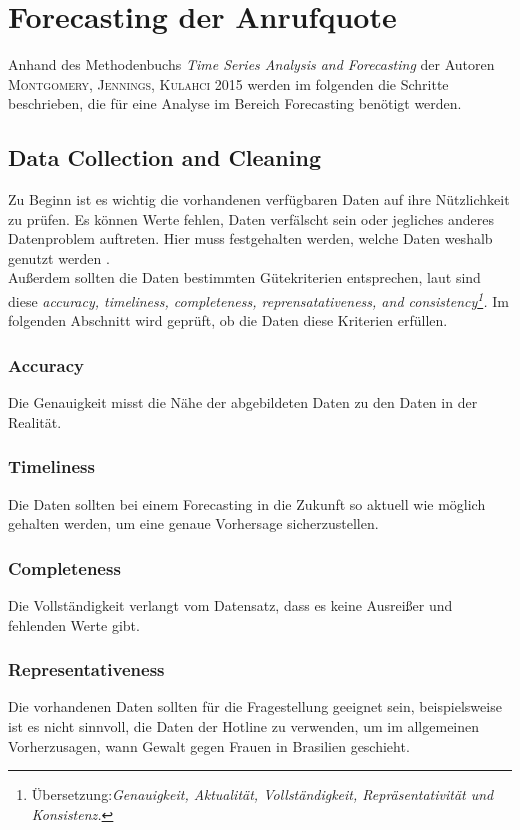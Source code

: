 \documentclass[12pt]{report}
\begin{document}
	\section{Forecasting der Anrufquote}
	Anhand des Methodenbuchs \textit{Time Series Analysis and Forecasting} der Autoren \textsc{Montgomery, Jennings, Kulahci} 2015 \cite{Montgomery.2015} werden im folgenden die Schritte beschrieben, die für eine Analyse im Bereich Forecasting benötigt werden.\\
	\subsection{Data Collection and Cleaning}
	Zu Beginn ist es wichtig die vorhandenen verfügbaren Daten auf ihre Nützlichkeit zu prüfen. Es können Werte fehlen, Daten verfälscht sein oder jegliches anderes Datenproblem auftreten. Hier muss festgehalten werden, welche Daten weshalb genutzt werden \cite[14]{Montgomery.2015}. \\
	Außerdem sollten die Daten bestimmten Gütekriterien entsprechen, laut \cite[17]{Montgomery.2015} sind diese \textit{ \glqq accuracy, timeliness, completeness, reprensatativeness, and consistency\footnote{Übersetzung:\textit{\glqq Genauigkeit, Aktualität, Vollständigkeit, Repräsentativität und Konsistenz.\grqq }}.\grqq} Im folgenden Abschnitt wird geprüft, ob die Daten diese Kriterien erfüllen.
	\subsubsection{Accuracy}
	Die Genauigkeit misst die Nähe der abgebildeten Daten zu den Daten in der Realität. 
	\subsubsection{Timeliness}
	Die Daten sollten bei einem Forecasting in die Zukunft so aktuell wie möglich gehalten werden, um eine genaue Vorhersage sicherzustellen. 
	\subsubsection{Completeness}
	Die Vollständigkeit verlangt vom Datensatz, dass es keine Ausreißer und fehlenden Werte gibt. 
	\subsubsection{Representativeness}
	Die vorhandenen Daten sollten für die Fragestellung geeignet sein, beispielsweise ist es nicht sinnvoll, die Daten der Hotline zu verwenden, um im allgemeinen Vorherzusagen, wann Gewalt gegen Frauen in Brasilien geschieht.
\end{document}
